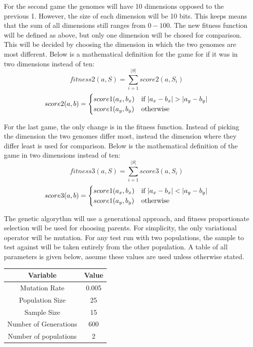 \documentclass{article}
\begin{document}
For the second game the genomes will have 10 dimensions opposed to the previous 1. However, the size of each dimension will be 10 bits. This keeps means that the sum of all dimensions still ranges from $ 0 - 100 $. The new fitness function will be defined as above, but only one dimension will be chosed for comparison. This will be decided by choosing the dimension in which the two genomes are most different. Below is a mathematical definition for the game for if it was in two dimensions instead of ten:
\begin{equation}
fitness2(a, S) = \sum^{|S|}_{i=1}score2(a, S_i)
\end{equation}
\begin{equation}
score2(a, b) = \begin{cases}
score1(a_x, b_x)& \text{if $ |a_x - b_x| > |a_y - b_y| $}\\
score1(a_y, b_y)& \text{otherwise}
\end{cases}
\end{equation}

For the last game, the only change is in the fitness function. Instead of picking the dimension the two genomes differ most, instead the dimension where they differ least is used for comparison. Below is the mathematical definition of the game in two dimensions instead of ten:
\begin{equation}
fitness3(a, S) = \sum^{|S|}_{i=1}score3(a, S_i)
\end{equation}
\begin{equation}
score3(a, b) = \begin{cases}
score1(a_x, b_x)& \text{if $ |a_x - b_x| < |a_y - b_y| $}\\
score1(a_y, b_y)& \text{otherwise}
\end{cases}
\end{equation}

The genetic algorythm will use a generational approach, and fitness proportionate selection will be used for choosing parents. For simplicity, the only variational operator will be mutation. For any test run with two populations, the sample to test against will be taken entirely from the other population. A table of all parameters is given below, assume these values are used unless otherwise stated.
\begin{table}[h]
\centering

\begin{tabular}{|c|c|}
\hline
\textbf{Variable} & \textbf{Value} \\ \hline\hline
Mutation Rate & 0.005 \\ \hline
Population Size & 25 \\ \hline
Sample Size & 15 \\ \hline
Number of Generations & 600 \\ \hline
Number of populations & 2 \\ \hline
\end{tabular}
\end{table}
\end{document}
